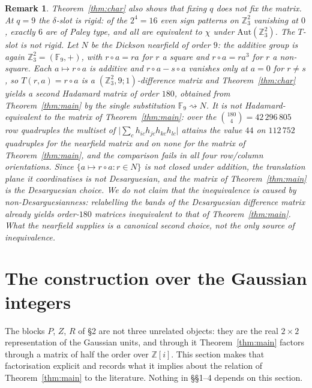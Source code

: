\documentclass[11pt]{article}
\newtheorem{remark}{Remark}
\newcommand{\F}{\mathbb F}
\newcommand{\Z}{\mathbb Z}
\begin{document}
\begin{remark}\label{rem:q9}
Theorem~\ref{thm:char} also shows that fixing \(q\) does not fix the matrix.
At \(q=9\) the \(\delta\)-slot is rigid: of the \(2^{4}=16\) even sign
patterns on \(\Z_3^{2}\) vanishing at \(0\), exactly \(6\) are of Paley type,
and all are equivalent to \(\chi\) under \(\mathrm{Aut}(\Z_3^{2})\).  The
\(T\)-slot is not rigid.  Let \(N\) be the Dickson nearfield of order \(9\):
the additive group is again \(\Z_3^{2}=(\F_9,+)\), with
\(r\circ a=ra\) for \(r\) a square and \(r\circ a=ra^{3}\) for \(r\) a
non-square.  Each \(a\mapsto r\circ a\) is additive and \(r\circ a-s\circ a\)
vanishes only at \(a=0\) for \(r\neq s\), so \(T(r,a)=r\circ a\) is a
\((\Z_3^{2},9;1)\)-difference matrix and Theorem~\ref{thm:char} yields a
second Hadamard matrix of order \(180\), obtained from Theorem~\ref{thm:main}
by the single substitution \(\F_9\rightsquigarrow N\).  It is not
Hadamard-equivalent to the matrix of Theorem~\ref{thm:main}: over the
\(\binom{180}{4}=42\,296\,805\) row quadruples the multiset of
\(\bigl|\sum_ch_{ic}h_{jc}h_{kc}h_{lc}\bigr|\) attains the value \(44\) on
\(112\,752\) quadruples for the nearfield matrix and on none for the matrix of
Theorem~\ref{thm:main}, and the comparison fails in all four row/column
orientations.  Since \(\{a\mapsto r\circ a: r\in N\}\) is not closed under
addition, the translation plane it coordinatises is not Desarguesian, and
the matrix of Theorem~\ref{thm:main} is the Desarguesian choice.  We do not
claim that the inequivalence is \emph{caused} by non-Desarguesianness:
relabelling the bands of the Desarguesian difference matrix already yields
order-\(180\) matrices inequivalent to that of Theorem~\ref{thm:main}.
What the nearfield supplies is a canonical second choice, not the only
source of inequivalence.
\end{remark}

\section{The construction over the Gaussian integers}
\label{sec:gaussian}

The blocks \(P\), \(Z\), \(R\) of \S2 are not three unrelated objects: they
are the real \(2\times2\) representation of the Gaussian units, and through
it Theorem~\ref{thm:main} factors through a matrix of half the order over
\(\Z[i]\).  This section makes that factorisation explicit and records what
it implies about the relation of Theorem~\ref{thm:main} to the literature.
Nothing in \S\S1--4 depends on this section.
\end{document}
